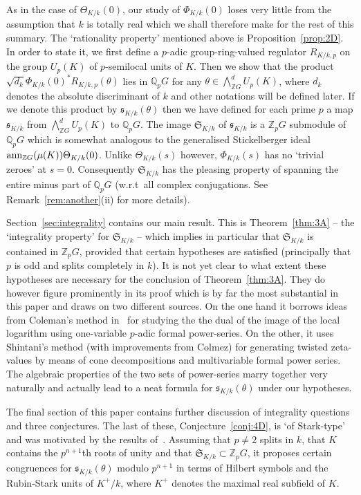 \documentclass[12pt]{article}
\newcounter{rem}[section]%
\newcommand{\bbC}{\ensuremath{\mathbb{C}}}
\newcommand{\bbQ}{\ensuremath{\mathbb{Q}}}
\newcommand{\bbZ}{\ensuremath{\mathbb{Z}}}
\newcommand{\fs}{\ensuremath{\mathfrak{s}}}
\newcommand{\fS}{\ensuremath{\mathfrak{S}}}
\newcommand{\ie}{\emph{i.e.}}
\newcommand{\rem}{\refstepcounter{rem}\noindent{\sc Remark \therem}}%
\renewcommand{\therem}{\thesection.\arabic{rem}}
\newcommand{\PhiKk}{\ensuremath{\Phi_{K/k}}}
\newcommand{\PhiKko}{\ensuremath{\Phi_{K/k}(0)}}
\newcommand{\pnpo}{\ensuremath{{p^{n+1}}}}
\newcommand{\sKk}{\ensuremath{\fs_{K/k}}}
\newcommand{\SKk}{\ensuremath{\fS_{K/k}}}
\newcommand{\ThetaKk}{\ensuremath{\Theta_{K/k}}}
\begin{document}
As in the case of $\ThetaKk(0)$, our study of $\PhiKko$ loses
very little from the assumption that $k$ is totally real which we shall
therefore make for the rest of this summary.
The `rationality property' mentioned above is Proposition~\ref{prop:2D}.
In order to state it, we first define a $p$-adic
group-ring-valued regulator $R_{K/k,p}$ on the group
$U_p(K)$ of $p$-semilocal units of $K$. Then we show that
the product $\sqrt{d_k}\PhiKk(0)^\ast R_{K/k,p}(\theta)$ lies in $\bbQ_p G$  for any
$\theta\in\bigwedge^d_{\bbZ G}U_p(K)$, where $d_k$ denotes the absolute discriminant of $k$
and other notations will be defined later.
If we denote this product by $\sKk(\theta)$ then we have defined for each prime $p$ a map
$\sKk$ from $\bigwedge^d_{\bbZ G}U_p(K)$ to $\bbQ_p G$.
The image $\SKk$ of $\sKk$ is a $\bbZ_p G$ submodule of $\bbQ_p G$ which is
somewhat analogous to the generalised Stickelberger ideal
${\rm ann}_{\bbZ G}(\mu(K))\ThetaKk(0)$.
Unlike $\Theta_{K/k}(s)$ however, $\PhiKk(s)$ has no `trivial zeroes' at $s=0$. Consequently
$\SKk$ has the pleasing property of spanning the entire minus part of $\bbQ_p G$
(w.r.t\ all complex conjugations.
See Remark~\ref{rem:another}(ii) for more details).

Section~\ref{sec:integrality} contains our main result.
 This is Theorem~\ref{thm:3A} -- the
`integrality property' for $\SKk$ -- which implies in particular that
$\SKk$ is contained in $\bbZ_p G$, provided that certain hypotheses are satisfied
(principally that $p$ is odd and splits completely in $k$). It is not yet clear to
what extent these hypotheses are necessary for the conclusion of Theorem~\ref{thm:3A}. They
do however figure prominently in
its proof which is by far the most substantial in this paper and
draws on two different sources.
On the one hand it borrows ideas from Coleman's method in~\cite{Coleman1} for studying
the the dual of the image of the local logarithm
using one-variable $p$-adic formal power-series.
On the other, it uses Shintani's method (with improvements from Colmez) for generating
twisted zeta-values by means of cone decompositions and
multivariable formal power series. The algebraic properties of the
two sets of power-series marry together very naturally and actually lead to
a neat formula for $\sKk(\theta)$ under our hypotheses.

The final section of this paper contains further discussion of integrality questions
and three conjectures. The last of these, Conjecture~\ref{conj:4D}, is `of Stark-type' and
was motivated by the results of~\cite{sconzp}.
Assuming that $p\neq 2$ splits in $k$, that $K$ contains the $\pnpo$th roots of unity
and that $\SKk\subset\bbZ_p G$, it
proposes certain congruences for $\sKk(\theta)$ modulo $\pnpo$ in terms of Hilbert symbols
and the Rubin-Stark units of $K^+/k$, where $K^+$ denotes the maximal
real subfield of $K$.
\end{document}
